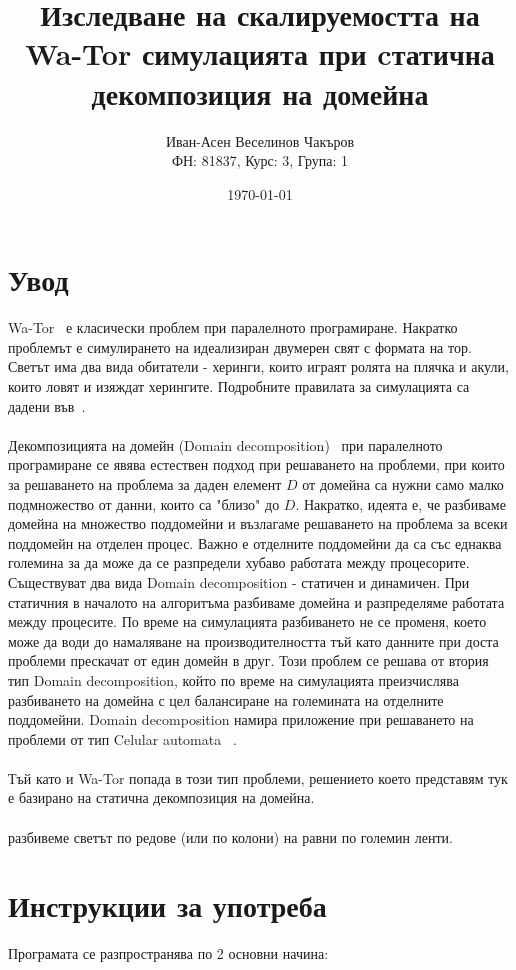\documentclass{article}
\title{Изследване на скалируемостта на Wa-Tor симулацията при cтатична декомпозиция на домейна}
\author{Иван-Асен Веселинов Чакъров \\
	ФН: 81837, Курс: 3, Група: 1}
\date{\today}
\begin{document}
\maketitle

\newpage

\tableofcontents

\newpage

\section{Увод}
Wa-Tor~\cite{wator} е класически проблем при паралелното програмиране.
Накратко проблемът е симулирането на идеализиран двумерен свят с формата на тор.
Светът има два вида обитатели - херинги, които играят ролята на плячка и акули, които ловят и изяждат херингите.
Подробните правилата за симулацията са дадени във~\cite{wator}.
\\
\\
Декомпозицията на домейн (Domain decomposition)~\cite{domain_decomposition}
при паралелното програмиране се явява естествен подход при решаването на проблеми,
при които за решаването на проблема за даден елемент $D$ от домейна са нужни само малко подмножество от данни,
които са "близо" до $D$. Накратко, идеята е, че разбиваме домейна на множество поддомейни
и възлагаме решаването на проблема за всеки поддомейн на отделен процес.
Важно е отделните поддомейни да са със еднаква големина за да може да се разпредели
хубаво работата между процесорите. Съществуват два вида Domain decomposition - статичен и динамичен.
При статичния в началото на алгоритъма разбиваме домейна и разпределяме работата между процесите.
По време на симулацията разбиването не се променя, което може да води до намаляване на производителността
тъй като данните при доста проблеми прескачат от един домейн в друг.
Този проблем се решава от втория тип Domain decomposition, който по време на симулацията
преизчислява разбиването на домейна с цел балансиране на големината на отделните поддомейни.
Domain decomposition намира приложение при решаването на проблеми от тип
Celular automata ~\cite{celular_automata}.
\\
\\
Тъй като и Wa-Tor попада в този тип проблеми, решението което представям тук е базирано
на статична декомпозиция на домейна.
\\
\\
разбивеме светът по редове (или по колони) на равни по големин ленти.

\section{Инструкции за употреба}
Програмата се разпространява по 2 основни начина:
\end{document}
